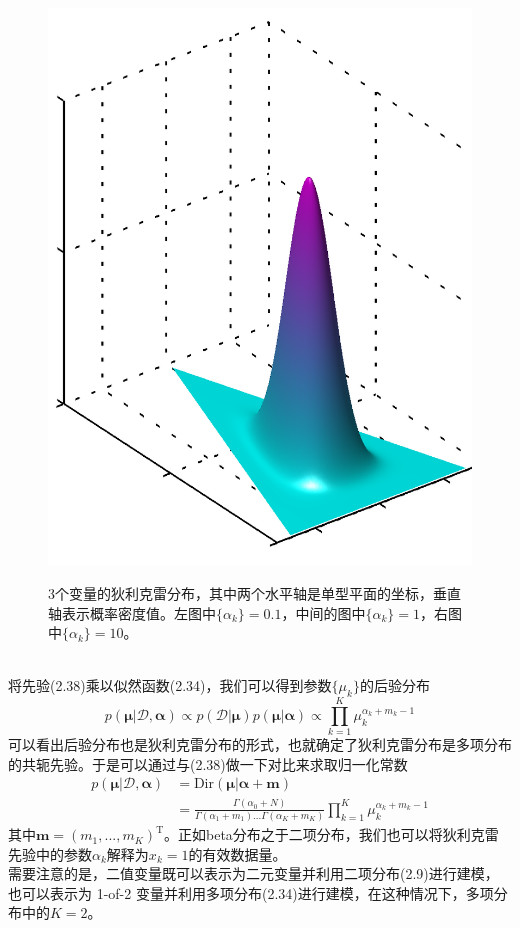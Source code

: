 \documentclass[b5paper]{book}
\numberwithin{equation}{chapter}
\newcommand {\rmT} {\mathrm{T}}
\newcommand {\bfMu} {\boldsymbol{\mu}}
\newcommand {\bfAl} {\boldsymbol{\alpha}}
\newcommand {\calD} {\mathcal{D}}
\begin{document}
{\begin{figure}[ht]
\begin{minipage}[t]{0.3\linewidth}
		\includegraphics[scale=0.8]{Images/2-5c.png}
		\label{fig:2-5c}
		\end{minipage}
		\caption{3个变量的狄利克雷分布，其中两个水平轴是单型平面的坐标，垂直轴表示概率密度值。左图中$\{\alpha_k\}=0.1$，中间的图中$\{\alpha_k\}=1$，右图中$\{\alpha_k\}=10$。}
	\end{figure}
	\\
	\indent 将先验(2.38)乘以似然函数(2.34)，我们可以得到参数$\{\mu_k\}$的后验分布
	\begin{equation}
		p(\bfMu|\mathcal{D},\boldsymbol{\alpha}) \propto p(\calD|\bfMu)p(\bfMu|\bfAl) \propto \prod_{k=1}^K \mu_k^{\alpha_k+m_k-1}
	\end{equation}
	可以看出后验分布也是狄利克雷分布的形式，也就确定了狄利克雷分布是多项分布的共轭先验。于是可以通过与(2.38)做一下对比来求取归一化常数
	\begin{equation}
	\begin{split}
		p(\bfMu|\calD,\bfAl) &= \mathrm{Dir}(\bfMu|\bfAl+\mathbf{m}) \\
		&=\frac{\Gamma(\alpha_0+N)}{\Gamma(\alpha_1+m_1)...\Gamma(\alpha_K+m_K)}\prod_{k=1}^K\mu_k^{\alpha_k+m_k-1}
	\end{split}
	\end{equation}
	其中$\mathbf{m}=(m_1,...,m_K)^{\rmT}$。正如beta分布之于二项分布，我们也可以将狄利克雷先验中的参数$\alpha_k$解释为$x_k=1$的有效数据量。\\
	\indent 需要注意的是，二值变量既可以表示为二元变量并利用二项分布(2.9)进行建模，也可以表示为 1-of-2 变量并利用多项分布(2.34)进行建模，在这种情况下，多项分布中的$K=2$。
	}
\end{document}
